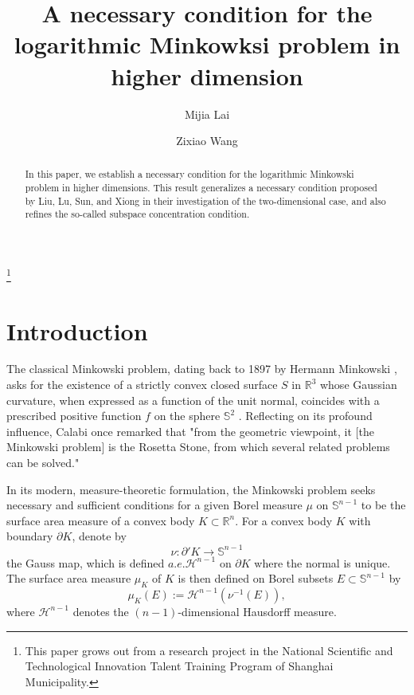 \documentclass[12pt]{amsart}
\numberwithin{equation}{section}
\numberwithin{lemma}{section}
\numberwithin{proposition}{section}
\numberwithin{corollary}{section}
\numberwithin{remark}{section}
\begin{document}
\title[A necessary condition for the logarithmic Minkowski problem]{A necessary condition for the logarithmic Minkowksi problem in higher dimension}

\author{Mijia Lai}
\address{School of Mathematical Sciences, Shanghai Jiao Tong University, Shanghai 200240, China}

\author{Zixiao Wang}
\address{Yangpu Senior High School, Shanghai 200092, China}

\thanks{This paper grows out from a research project in the National Scientific and Technological Innovation Talent Training Program of Shanghai Municipality.}
\date{}
\begin{abstract}
In this paper, we establish a necessary condition for the logarithmic Minkowski problem in higher dimensions. This result generalizes a necessary condition proposed by Liu, Lu, Sun, and Xiong in their investigation of the two-dimensional case, and also refines the so-called subspace concentration condition.
\end{abstract}
\maketitle
\section{Introduction}
The classical Minkowski problem, dating back to 1897 by Hermann Minkowski \cite{Mi}, asks for the existence of a strictly convex closed surface $S$ in $\mathbb{R}^3$ whose Gaussian curvature, when expressed as a function of the unit normal, coincides with a prescribed positive function $f$ on the sphere $\mathbb{S}^{2}$ . Reflecting on its profound influence, Calabi once remarked that "from the geometric viewpoint, it [the Minkowski problem] is the Rosetta Stone, from which several related problems can be solved."

In its modern, measure-theoretic formulation, the Minkowski problem seeks necessary and sufficient conditions for a given Borel measure $\mu$ on $\mathbb{S}^{n-1}$ to be the surface area measure of a convex body $K \subset \mathbb{R}^n$. For a convex body $K$ with boundary $\partial K$, denote by
\[
\nu: \partial' K \rightarrow \mathbb{S}^{n-1}
\]
the Gauss map, which is defined $a.e. \mathcal{H}^{n-1}$ on $\partial K$ where the normal is unique. The surface area measure $\mu_K$ of $K$ is then defined on Borel subsets $E \subset \mathbb{S}^{n-1}$ by
$$
\mu_K(E):=\mathcal{H}^{n-1}\left(\nu^{-1}(E)\right),
$$
where $\mathcal{H}^{n-1}$ denotes the $(n-1)$-dimensional Hausdorff measure. 
\end{document}
